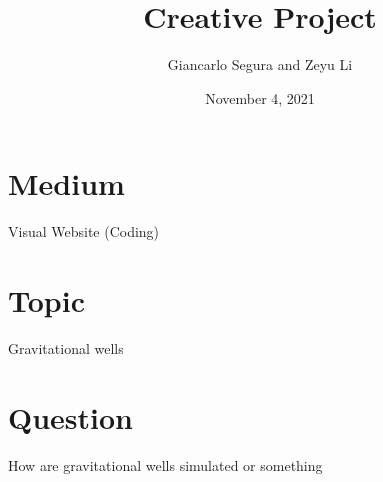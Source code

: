 \documentclass{article}
\begin{document}
\title{Creative Project}
\author{Giancarlo Segura and Zeyu Li}
\date{November 4, 2021}

\maketitle

\section{Medium}

Visual Website (Coding)

\section{Topic}

Gravitational wells

\section{Question}

How are gravitational wells simulated or something 
\end{document}
